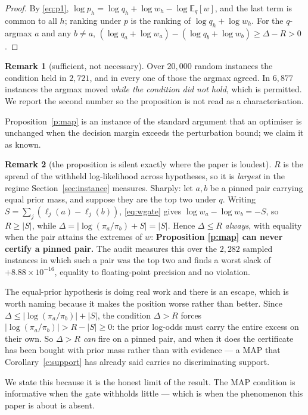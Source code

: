 \documentclass[11pt,a4paper]{article}
\theoremstyle{definition}
\newtheorem{remark}{Remark}
\begin{document}
\begin{proof}
By \eqref{eq:p1}, $\log p_h=\log q_h+\log w_h-\log\mathbb{E}_q[w]$, and the
last term is common to all $h$; ranking under $p$ is the ranking of
$\log q_h+\log w_h$. For the $q$-argmax $a$ and any $b\ne a$,
$(\log q_a+\log w_a)-(\log q_b+\log w_b)\ge \Delta-R>0$.
\end{proof}

\begin{remark}[sufficient, not necessary]
Over $20{,}000$ random instances the condition held in $2{,}721$, and in every
one of those the argmax agreed. In $6{,}877$ instances the argmax moved
\emph{while the condition did not hold}, which is permitted. We report the
second number so the proposition is not read as a characterisation.
\end{remark}

Proposition~\ref{p:map} is an instance of the standard argument that an
optimiser is unchanged when the decision margin exceeds the perturbation bound;
we claim it as known.

\begin{remark}[the proposition is silent exactly where the paper is loudest]
\label{r:mapblind}
$R$ is the spread of the withheld log-likelihood across hypotheses, so it is
\emph{largest} in the regime Section~\ref{sec:instance} measures. Sharply: let
$a,b$ be a pinned pair carrying equal prior mass, and suppose they are the top
two under $q$. Writing $S=\sum_j(\ell_j(a)-\ell_j(b))$, \eqref{eq:wgate} gives
$\log w_a-\log w_b=-S$, so $R\ge|S|$, while
$\Delta=|\log(\pi_a/\pi_b)+S|=|S|$. Hence $\Delta\le R$ \emph{always}, with
equality when the pair attains the extremes of $w$: \textbf{Proposition
\ref{p:map} can never certify a pinned pair.} The audit measures this over the
$2{,}282$ sampled instances in which such a pair was the top two and finds a
worst slack of $+8.88\times10^{-16}$, equality to floating-point precision and
no violation.

The equal-prior hypothesis is doing real work and there is an escape, which is
worth naming because it makes the position worse rather than better. Since
$\Delta\le|\log(\pi_a/\pi_b)|+|S|$, the condition $\Delta>R$ forces
$|\log(\pi_a/\pi_b)|>R-|S|\ge 0$: the prior log-odds must carry the entire
excess on their own. So $\Delta>R$ \emph{can} fire on a pinned pair, and when
it does the certificate has been bought with prior mass rather than with
evidence --- a MAP that Corollary~\ref{c:support} has already said carries no
discriminating support.

We state this because it is the honest limit of the result. The MAP condition
is informative when the gate withholds little --- which is when the phenomenon
this paper is about is absent.
\end{remark}
\end{document}
